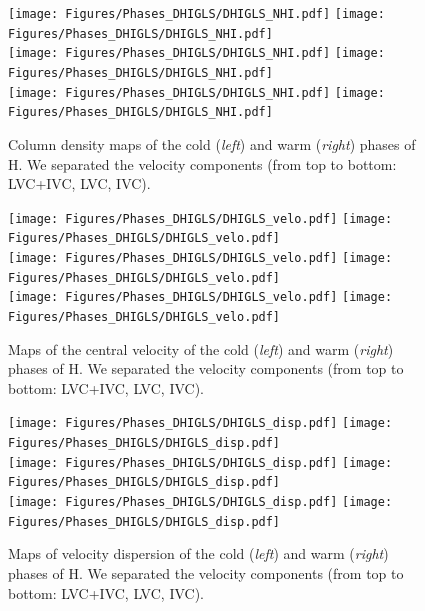 \documentclass[traditabstract]{aa}
\begin{document}
\begin{figure}[h]
  \centering
  \texttt{[image: Figures/Phases\_DHIGLS/DHIGLS\_NHI.pdf]}
  \hspace{5mm}
  \texttt{[image: Figures/Phases\_DHIGLS/DHIGLS\_NHI.pdf]} \\
  \vspace{5mm}
  \texttt{[image: Figures/Phases\_DHIGLS/DHIGLS\_NHI.pdf]}
  \hspace{5mm}
  \texttt{[image: Figures/Phases\_DHIGLS/DHIGLS\_NHI.pdf]} \\
  \vspace{5mm}
  \texttt{[image: Figures/Phases\_DHIGLS/DHIGLS\_NHI.pdf]}
  \hspace{5mm}
  \texttt{[image: Figures/Phases\_DHIGLS/DHIGLS\_NHI.pdf]}
  \caption{\label{Phases_DHIGLS} Column density maps of the cold (\emph{left}) and warm (\emph{right}) phases of H. We separated the velocity components (from top to bottom: LVC+IVC, LVC, IVC).}
\end{figure}

\begin{figure}[h]
  \centering
  \texttt{[image: Figures/Phases\_DHIGLS/DHIGLS\_velo.pdf]}
  \hspace{5mm}
  \texttt{[image: Figures/Phases\_DHIGLS/DHIGLS\_velo.pdf]} \\
  \vspace{5mm}
  \texttt{[image: Figures/Phases\_DHIGLS/DHIGLS\_velo.pdf]}
  \hspace{5mm}
  \texttt{[image: Figures/Phases\_DHIGLS/DHIGLS\_velo.pdf]} \\
  \vspace{5mm}
  \texttt{[image: Figures/Phases\_DHIGLS/DHIGLS\_velo.pdf]}
  \hspace{5mm}
  \texttt{[image: Figures/Phases\_DHIGLS/DHIGLS\_velo.pdf]}
  \caption{Maps of the central velocity of the cold (\emph{left}) and warm (\emph{right}) phases of H. We separated the velocity components (from top to bottom: LVC+IVC, LVC, IVC).}
\end{figure}

\begin{figure}[h]
  \centering
  \texttt{[image: Figures/Phases\_DHIGLS/DHIGLS\_disp.pdf]}
  \hspace{5mm}
  \texttt{[image: Figures/Phases\_DHIGLS/DHIGLS\_disp.pdf]} \\
  \vspace{5mm}
  \texttt{[image: Figures/Phases\_DHIGLS/DHIGLS\_disp.pdf]}
  \hspace{5mm}
  \texttt{[image: Figures/Phases\_DHIGLS/DHIGLS\_disp.pdf]} \\
  \vspace{5mm}
  \texttt{[image: Figures/Phases\_DHIGLS/DHIGLS\_disp.pdf]}
  \hspace{5mm}
  \texttt{[image: Figures/Phases\_DHIGLS/DHIGLS\_disp.pdf]}
  \caption{Maps of velocity dispersion of the cold (\emph{left}) and warm (\emph{right}) phases of H. We separated the velocity components (from top to bottom: LVC+IVC, LVC, IVC).}
\end{figure}
\end{document}
